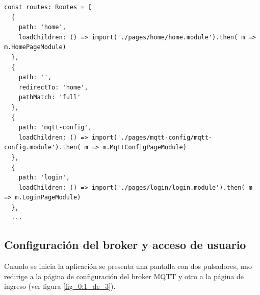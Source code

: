 \begin{lstlisting}[label=cod:Rutas aplicación Móvil.,caption=  Fragmento de las rutas de la aplicación móvil.]
const routes: Routes = [
  {
    path: 'home',
    loadChildren: () => import('./pages/home/home.module').then( m => m.HomePageModule)
  },
  {
    path: '',
    redirectTo: 'home',
    pathMatch: 'full'
  },
  {
    path: 'mqtt-config',
    loadChildren: () => import('./pages/mqtt-config/mqtt-config.module').then( m => m.MqttConfigPageModule)
  },
  {
    path: 'login',
    loadChildren: () => import('./pages/login/login.module').then( m => m.LoginPageModule)
  },
  ...

\end{lstlisting} 

\pagebreak

\subsection{Configuración del broker y acceso de usuario}

Cuando se inicia la aplicación se presenta una pantalla con dos pulsadores, uno redirige a la página de configuración del broker MQTT y otro a la página de ingreso (ver figura \ref{fig_0:1_de_3}).



